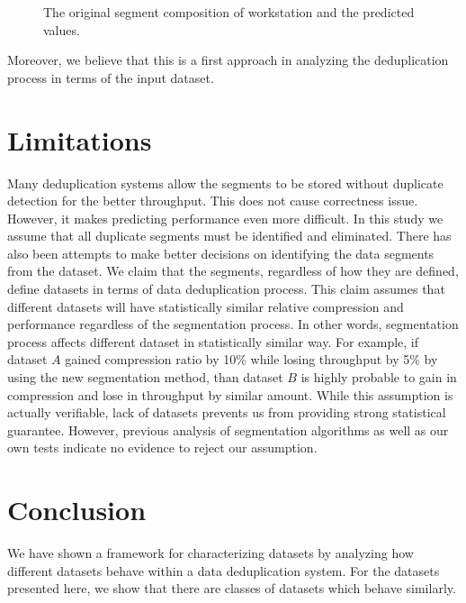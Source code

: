  \begin{figure}[!t]
\centerline{
\hfil
{}
}
\caption{The original segment composition of workstation and the predicted values.}
\label{pred}
\end{figure}

Moreover, we believe that this is a first approach in analyzing the deduplication process in terms of the input dataset. \\

\section{Limitations}\label{lim}
Many deduplication systems allow the segments to be stored without duplicate detection for the better throughput\cite{5366623, Lillibridge:2009:SIL:1525908.1525917}. This does not cause correctness issue. However, it makes predicting performance even more difficult. In this study we assume that all duplicate segments must be identified and eliminated. There has also been attempts to make better decisions on identifying the data segments from the dataset\cite{eshghi2005framework,kruus-bimodal, bobbarjung2006improving}. We claim that the segments, regardless of how they are defined, define datasets in terms of data deduplication process. This claim assumes that different datasets will have statistically similar relative compression and performance regardless of the segmentation process. In other words, segmentation process affects different dataset in statistically similar way. For example, if dataset $A$ gained compression ratio by 10\% while losing throughput by 5\% by using the new segmentation method, than dataset $B$ is highly probable to gain in compression and lose in throughput by similar amount. While this assumption is actually verifiable, lack of datasets prevents us from providing strong statistical guarantee. However, previous analysis of segmentation algorithms\cite{kruus-bimodal} as well as our own tests indicate no evidence to reject our assumption.

\section{Conclusion}\label{con}
We have shown a framework for characterizing datasets by analyzing how different datasets behave within a data deduplication system. For the datasets presented here, we show that there are classes of datasets which behave similarly.

